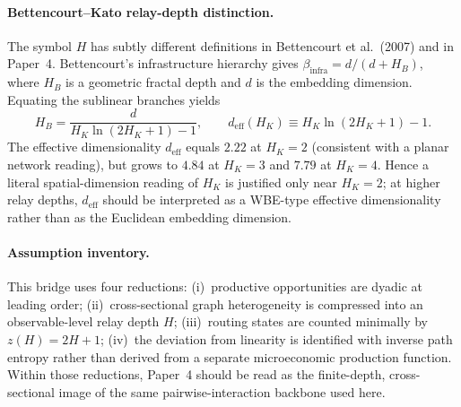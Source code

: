 \documentclass[11pt]{article}
\begin{document}
\paragraph{Bettencourt--Kato relay-depth distinction.}
The symbol $H$ has subtly different definitions in Bettencourt et al.\ (2007) and in Paper~4.
Bettencourt's infrastructure hierarchy gives $\beta_{\mathrm{infra}}=d/(d+H_B)$, where $H_B$ is
a geometric fractal depth and $d$ is the embedding dimension.  Equating the sublinear branches yields
\[
H_B = \frac{d}{H_K\ln(2H_K+1)-1},
\qquad
d_{\mathrm{eff}}(H_K) \equiv H_K\ln(2H_K+1)-1.
\]
The effective dimensionality $d_{\mathrm{eff}}$ equals $2.22$ at $H_K=2$ (consistent with a
planar network reading), but grows to $4.84$ at $H_K=3$ and $7.79$ at $H_K=4$.
Hence a literal spatial-dimension reading of $H_K$ is justified only near $H_K=2$;
at higher relay depths, $d_{\mathrm{eff}}$ should be interpreted as a
WBE-type effective dimensionality rather than as the Euclidean embedding dimension.

\paragraph{Assumption inventory.}
This bridge uses four reductions:
(i)~productive opportunities are dyadic at leading order;
(ii)~cross-sectional graph heterogeneity is compressed into an
observable-level relay depth $H$;
(iii)~routing states are counted minimally by $z(H)=2H+1$;
(iv)~the deviation from linearity is identified with inverse path entropy
rather than derived from a separate microeconomic production function.
Within those reductions, Paper~4 should be read as the finite-depth,
cross-sectional image of the same pairwise-interaction backbone used here.

\end{document}

